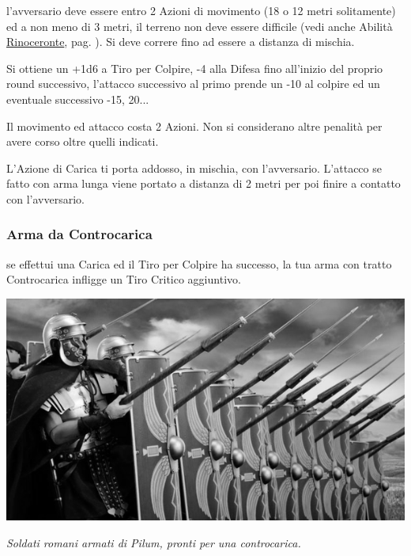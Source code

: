 \begin{multicols}{2}
l'avversario deve essere entro 2 Azioni di movimento (18 o 12 metri solitamente) ed a non meno di 3 metri, il terreno non deve essere difficile (vedi anche Abilità \hyperlink{abRinoceronte}{Rinoceronte}, pag. \pageref{Rinoceronte}). Si deve correre fino ad essere a distanza di mischia.

Si ottiene un +1d6 a Tiro per Colpire, -4 alla Difesa fino all'inizio del proprio round successivo, l'attacco successivo al primo prende un -10 al colpire ed un eventuale successivo -15, 20...

Il movimento ed attacco costa 2 Azioni. Non si considerano altre penalità per avere corso oltre quelli indicati.

L'Azione di Carica ti porta addosso, in mischia, con l'avversario. L'attacco se fatto con arma lunga viene portato a distanza di 2 metri per poi finire a contatto con l'avversario.



\subsubsection{Arma da Controcarica}\label{controcarica}\label{caricaarmadacontrocarica}

se effettui una Carica ed il Tiro per Colpire ha successo, la tua arma con tratto Controcarica infligge un Tiro Critico aggiuntivo.

\begin{center}
	\includegraphics[width=0.9\linewidth]{immagini/pilum.png}

	\emph{Soldati romani armati di Pilum, pronti per una controcarica.}
\end{center}


\end{multicols}
